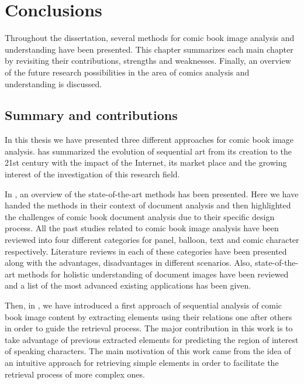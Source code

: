 \chapter{Conclusions} %
\label{chap:conclusions}

Throughout the dissertation, several methods for comic book image analysis and understanding have been presented.
This chapter summarizes each main chapter by revisiting their contributions, strengths and weaknesses.
Finally, an overview of the future research possibilities in the area of comics analysis and understanding is discussed.

\section{Summary and contributions}
\label{conclusions:summary}


In this thesis we have presented three different approaches for comic book image analysis.  has summarized the evolution of sequential art from its creation to the 21st century with the impact of the Internet, its market place and the growing interest of the investigation of this research field.

In , an overview of the state-of-the-art methods has been presented. Here we have handed the methods in their context of document analysis and then highlighted the challenges of comic book document analysis due to their specific design process.
All the past studies related to comic book image analysis have been reviewed into four different categories for panel, balloon, text and comic character respectively.
Literature reviews in each of these categories have been presented along with the advantages, disadvantages in different scenarios.
Also, state-of-the-art methods for holistic understanding of document images have been reviewed and a list of the most advanced existing applications has been given.

Then, in , we have introduced a first approach of sequential analysis of comic book image content by extracting elements using their relations one after others in order to guide the retrieval process.
The major contribution in this work is to take advantage of previous extracted elements for predicting the region of interest of speaking characters.
The main motivation of this work came from the idea of an intuitive approach for retrieving simple elements in order to facilitate the retrieval process of more complex ones.

